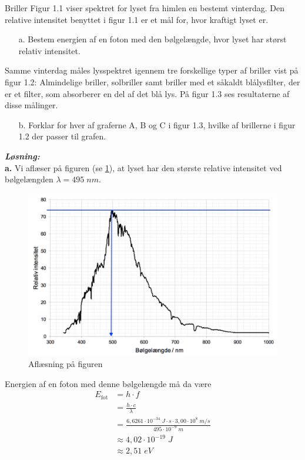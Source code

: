 \documentclass{report}
\newcommand{\sol}{\setlength{\parindent}{0cm}\textbf{\textit{Løsning:}}\setlength{\parindent}{1cm}}
\begin{document}
\begin{question}{Briller}{}
  Figur 1.1 viser spektret for lyset fra himlen en bestemt vinterdag.
  Den relative intensitet benyttet i figur 1.1 er et mål for, hvor kraftigt lyset er.
  \begin{itemize}
    \item[a.] Bestem energien af en foton med den bølgelængde, hvor lyset har størst relativ intensitet.
  \end{itemize}
Samme vinterdag måles lysspektret igennem tre forskellige typer af briller vist på figur 1.2: Almindelige briller, solbriller samt briller med et såkaldt blålysfilter, der er et filter, som absorberer en del af det blå lys.
På figur 1.3 ses resultaterne af disse målinger.
\begin{itemize}
  \item[b.] Forklar for hver af graferne A, B og C i figur 1.3, hvilke af brillerne i figur 1.2 der passer til grafen.
\end{itemize}
\end{question}
\sol \\
\textbf{a.}
Vi aflæser på figuren (se \cref{fig:lys}), at lyset har den største relative intensitet ved bølgelængden $\lambda = 495 \;\unit{nm} $.
\begin{figure}[H]
\begin{center}
  \includegraphics[width=\textwidth]{lys.png}
\end{center}
\caption{Aflæsning på figuren}
\label{fig:lys}
\end{figure}
Energien af en foton med denne bølgelængde må da være
\begin{equation*}
\begin{split}
E _{\text{fot} }&=h \cdot f \\
&=\frac{h \cdot c}{\lambda }\\
&=\frac{6,6261 \cdot 10 ^{-34}\;\unit{J \cdot s} \cdot 3,00 \cdot 10 ^{8} \;\unit{m/s} }{495 \cdot 10 ^{-9}\;\unit{m} }\\
&\approx 4,02 \cdot 10 ^{-19} \;\unit{J} \\
&\approx 2,51 \;\unit{eV} 
\end{split}
\end{equation*}
\end{document}
